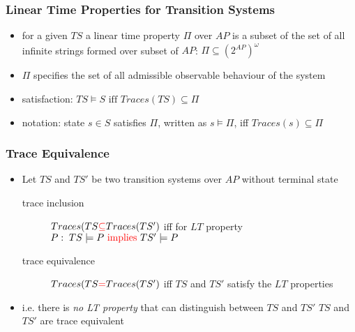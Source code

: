 \documentclass[a4paper, 10pt]{article}
\begin{document}
\subsubsection*{Linear Time Properties for Transition Systems}
\begin{shaded}
    \begin{itemize}
        \item for a given $TS$ a linear time property $\Pi$ over $AP$ is a subset of the set of all infinite strings formed over subset of $AP$: $\Pi\subseteq(2^{AP})^\omega$
        \item $\Pi$ specifies the set of all admissible observable behaviour of the system
        \item satisfaction: $TS\models S \textrm{ iff } Traces(TS) \subseteq \Pi$
        \item notation: state $s\in S$ satisfies $\Pi$, written as $s\models \Pi$, iff $Traces(s)\subseteq\Pi$
    \end{itemize}
\end{shaded}

\subsubsection*{Trace Equivalence}
\begin{itemize}
    \item Let $TS$ and $TS'$ be two transition systems over $AP$ without terminal state
    \begin{description}
        \item[trace inclusion] $Traces(TS\textcolor{red}{\subseteq} Traces(TS')$ iff for  $LT$ property $P:\;TS\models P \textrm{ \textcolor{red}{implies} } TS'\models P$
        \item[trace equivalence] $Traces(TS\textcolor{red}{=} Traces(TS')$ iff $TS$ and $TS'$ satisfy the  $LT$ properties
    \end{description}
    \item i.e. there is \emph{no LT property} that can distinguish between $TS$ and $TS'$ \follows $TS$ and $TS'$ are trace equivalent
\end{itemize}
\end{document}
